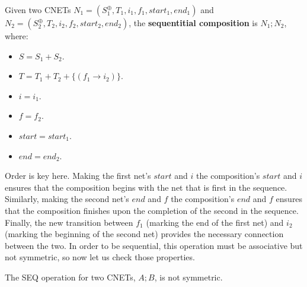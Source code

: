 \begin{definition}
  \label{def:SEQ-PN}
   Given two CNETs $N_1 = (S_1^\oplus, T_1, i_1, f_1, start_1, end_1)$ and $N_2 = (S_2^\oplus, T_2,  i_2, f_2, start_2, end_2)$, the \textbf{sequentitial composition} is  $N_1 ; N_2$, where: 
\begin{itemize} 
\item $S = S_1 + S_2$.
\item $T = T_1 + T_2 + \{(f_1 \rightarrow i_2)\}$.
\item $i = i_1$.
\item $f=f_2$.
\item $start = start_1$.
\item $end = end_2$.
\end{itemize} 
Order is key here. Making the first net's $start$ and $i$ the composition's $start$ and $i$ ensures that the composition begins with the net that is first in the sequence. Similarly, making the second net's $end$ and $f$ the composition's $end$ and $f$ ensures that the composition finishes upon the completion of the second in the sequence. Finally, the new transition between $f_1$ (marking the end of the first net) and $i_2$ (marking the beginning of the second net) provides the necessary connection between the two. 
In order to be sequential, this operation must be associative but not symmetric, so now let us check those properties. 
\end{definition}
\begin {lemma}
 \label{lemma:SEQ-NOT-SYMM}
 The SEQ operation for two CNETs, $A;B$, is not symmetric. 
\end{lemma}
